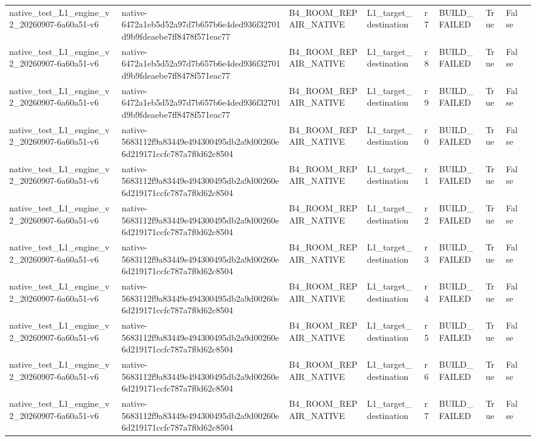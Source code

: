 \begin{tabular}{lllllllll}
native\_test\_L1\_engine\_v2\_20260907-6a60a51-v6 & native-6472a1eb5d52a97d7b657b6e4ded936f32701d9b9fdeaebe7ff8478f571eac77 & B4\_ROOM\_REPAIR\_NATIVE & L1\_target\_destination & r7 & BUILD\_FAILED & True & False &  \\
native\_test\_L1\_engine\_v2\_20260907-6a60a51-v6 & native-6472a1eb5d52a97d7b657b6e4ded936f32701d9b9fdeaebe7ff8478f571eac77 & B4\_ROOM\_REPAIR\_NATIVE & L1\_target\_destination & r8 & BUILD\_FAILED & True & False &  \\
native\_test\_L1\_engine\_v2\_20260907-6a60a51-v6 & native-6472a1eb5d52a97d7b657b6e4ded936f32701d9b9fdeaebe7ff8478f571eac77 & B4\_ROOM\_REPAIR\_NATIVE & L1\_target\_destination & r9 & BUILD\_FAILED & True & False &  \\
native\_test\_L1\_engine\_v2\_20260907-6a60a51-v6 & native-5683112f9a83449e494300495db2a9d00260e6d219171ccfc787a7f0d62c8504 & B4\_ROOM\_REPAIR\_NATIVE & L1\_target\_destination & r0 & BUILD\_FAILED & True & False &  \\
native\_test\_L1\_engine\_v2\_20260907-6a60a51-v6 & native-5683112f9a83449e494300495db2a9d00260e6d219171ccfc787a7f0d62c8504 & B4\_ROOM\_REPAIR\_NATIVE & L1\_target\_destination & r1 & BUILD\_FAILED & True & False &  \\
native\_test\_L1\_engine\_v2\_20260907-6a60a51-v6 & native-5683112f9a83449e494300495db2a9d00260e6d219171ccfc787a7f0d62c8504 & B4\_ROOM\_REPAIR\_NATIVE & L1\_target\_destination & r2 & BUILD\_FAILED & True & False &  \\
native\_test\_L1\_engine\_v2\_20260907-6a60a51-v6 & native-5683112f9a83449e494300495db2a9d00260e6d219171ccfc787a7f0d62c8504 & B4\_ROOM\_REPAIR\_NATIVE & L1\_target\_destination & r3 & BUILD\_FAILED & True & False &  \\
native\_test\_L1\_engine\_v2\_20260907-6a60a51-v6 & native-5683112f9a83449e494300495db2a9d00260e6d219171ccfc787a7f0d62c8504 & B4\_ROOM\_REPAIR\_NATIVE & L1\_target\_destination & r4 & BUILD\_FAILED & True & False &  \\
native\_test\_L1\_engine\_v2\_20260907-6a60a51-v6 & native-5683112f9a83449e494300495db2a9d00260e6d219171ccfc787a7f0d62c8504 & B4\_ROOM\_REPAIR\_NATIVE & L1\_target\_destination & r5 & BUILD\_FAILED & True & False &  \\
native\_test\_L1\_engine\_v2\_20260907-6a60a51-v6 & native-5683112f9a83449e494300495db2a9d00260e6d219171ccfc787a7f0d62c8504 & B4\_ROOM\_REPAIR\_NATIVE & L1\_target\_destination & r6 & BUILD\_FAILED & True & False &  \\
native\_test\_L1\_engine\_v2\_20260907-6a60a51-v6 & native-5683112f9a83449e494300495db2a9d00260e6d219171ccfc787a7f0d62c8504 & B4\_ROOM\_REPAIR\_NATIVE & L1\_target\_destination & r7 & BUILD\_FAILED & True & False &  \\

\end{tabular}
